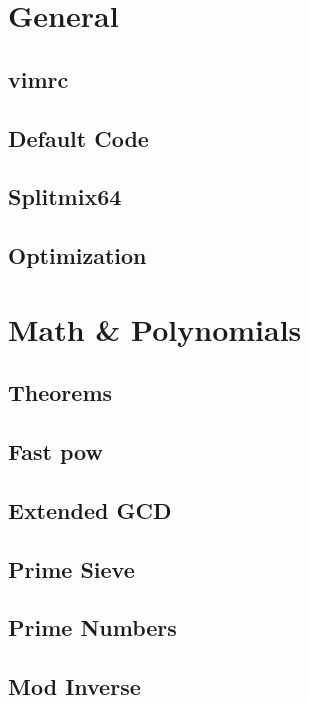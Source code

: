 
\section{General}
\subsection{vimrc}

\subsection{Default Code}

\subsection{Splitmix64}

\subsection{Optimization}


\section{Math \& Polynomials}
\subsection{Theorems}

\subsection{Fast pow}

\subsection{Extended GCD}

\subsection{Prime Sieve}

\subsection{Prime Numbers}

\subsection{Mod Inverse}

